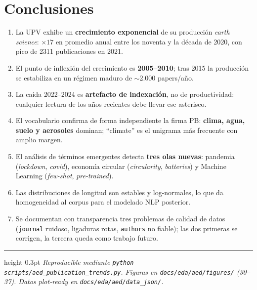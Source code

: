 \documentclass[11pt,a4paper]{article}
\newcommand{\file}[1]{\texttt{\small #1}}
\begin{document}
\section{Conclusiones}

\begin{enumerate}
\item La UPV exhibe un \textbf{crecimiento exponencial} de su producción \emph{earth science}: $\times 17$ en promedio anual entre los noventa y la década de 2020, con pico de \num{2311} publicaciones en 2021.
\item El punto de inflexión del crecimiento es \textbf{2005--2010}; tras 2015 la producción se estabiliza en un régimen maduro de $\sim$2.000 papers/año.
\item La caída 2022--2024 es \textbf{artefacto de indexación}, no de productividad: cualquier lectura de los años recientes debe llevar ese asterisco.
\item El vocabulario confirma de forma independiente la firma PB: \textbf{clima, agua, suelo y aerosoles} dominan; ``climate'' es el unigrama más frecuente con amplio margen.
\item El análisis de términos emergentes detecta \textbf{tres olas nuevas}: pandemia (\emph{lockdown}, \emph{covid}), economía circular (\emph{circularity}, \emph{batteries}) y Machine Learning (\emph{few-shot}, \emph{pre-trained}).
\item Las distribuciones de longitud son estables y log-normales, lo que da homogeneidad al corpus para el modelado NLP posterior.
\item Se documentan con transparencia tres problemas de calidad de datos (\texttt{journal} ruidoso, ligaduras rotas, \texttt{authors} no fiable); las dos primeras se corrigen, la tercera queda como trabajo futuro.
\end{enumerate}

\vfill
\hrule height 0.3pt
\medskip
\small\textit{Reproducible mediante \file{python scripts/aed\_publication\_trends.py}. Figuras en \file{docs/eda/aed/figures/} (30--37). Datos plot-ready en \file{docs/eda/aed/data\_json/}.}
\end{document}

